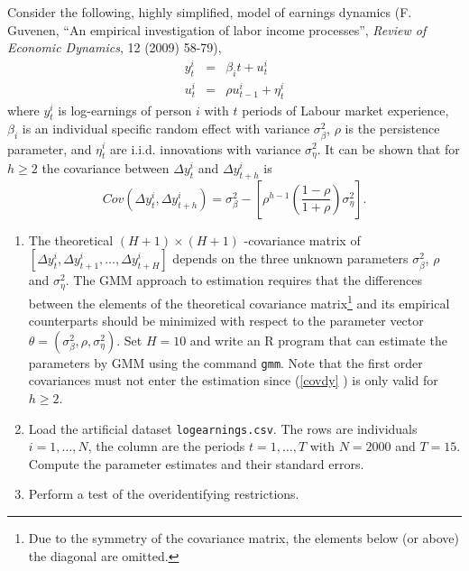 \documentclass{article}
\begin{document}
Consider the following, highly simplified, model of earnings dynamics (F.
Guvenen, \textquotedblleft An empirical investigation of labor income
processes\textquotedblright , \emph{Review of Economic Dynamics}, 12 (2009)
58-79),%
\begin{eqnarray*}
y_{t}^{i} &=&\beta _{i}t+u_{t}^{i} \\
u_{t}^{i} &=&\rho u_{t-1}^{i}+\eta _{t}^{i}
\end{eqnarray*}%
where $y_{t}^{i}$ is log-earnings of person $i$ with $t$ periods of Labour
market experience, $\beta _{i}$ is an individual specific random effect with
variance $\sigma _{\beta }^{2}$, $\rho $ is the persistence parameter, and $%
\eta _{t}^{i}$ are i.i.d. innovations with variance $\sigma _{\eta }^{2}$.
It can be shown that for $h\geq 2$ the covariance between $\Delta y_{t}^{i}$
and $\Delta y_{t+h}^{i}$ is%
\begin{equation}
Cov\left( \Delta y_{t}^{i},\Delta y_{t+h}^{i}\right) =\sigma _{\beta }^{2}-
\left[ \rho ^{h-1}\left( \frac{1-\rho }{1+\rho }\right) \sigma _{\eta }^{2}%
\right] .  \label{covdy}
\end{equation}

\begin{enumerate}
\item The theoretical $\left( H+1\right) \times \left( H+1\right) $%
-covariance matrix of $\left[ \Delta y_{t}^{i},\Delta y_{t+1}^{i},\ldots
,\Delta y_{t+H}^{i}\right] $ depends on the three unknown parameters $\sigma
_{\beta }^{2}$, $\rho $ and $\sigma _{\eta }^{2}$. The GMM approach to
estimation requires that the differences between the elements of the
theoretical covariance matrix\footnote{%
Due to the symmetry of the covariance matrix, the elements below (or above)
the diagonal are omitted.} and its empirical counterparts should be
minimized with respect to the parameter vector $\theta =(\sigma _{\beta
}^{2},\rho ,\sigma _{\eta }^{2})$. Set $H=10$ and write an R program that
can estimate the parameters by GMM using the command \texttt{gmm}. Note that
the first order covariances must not enter the estimation since (\ref{covdy}%
) is only valid for $h\geq 2$.

\item Load the artificial dataset \texttt{logearnings.csv}. The rows are
individuals $i=1,\ldots ,N$, the column are the periods $t=1,\ldots ,T$ with
$N=2000$ and $T=15$. Compute the parameter estimates and their standard
errors.

\item Perform a test of the overidentifying restrictions.
\end{enumerate}
\end{document}
